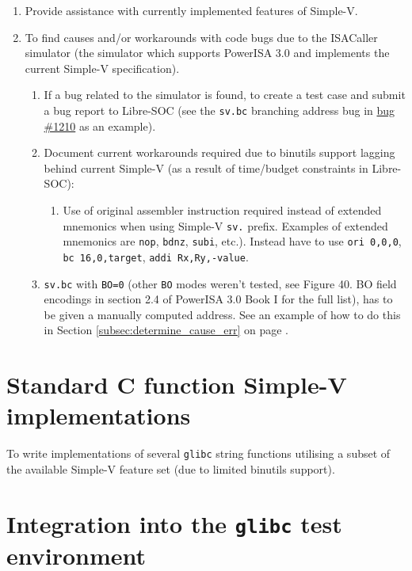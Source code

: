 \begin{enumerate}
  \item Provide assistance with currently implemented features of Simple-V.
  \item To find causes and/or workarounds with code bugs due to the ISACaller
simulator (the simulator which supports PowerISA 3.0 and implements the current
Simple-V specification).
  \begin{enumerate}
    \item If a bug related to the simulator is found, to create a test
  case and submit a bug report to Libre-SOC (see the \texttt{sv.bc} branching address
  bug in \href{https://bugs.libre-soc.org/show_bug.cgi?id=1210}{bug \#1210}
  as an example).
    \item Document current workarounds required due to binutils support lagging
  behind current Simple-V (as a result of time/budget constraints in Libre-SOC):
    \begin{enumerate}
      \item  Use of original assembler instruction required instead of
      extended mnemonics when using Simple-V \texttt{sv.} prefix.
      Examples of extended mnemonics are \texttt{nop}, \texttt{bdnz},
      \texttt{subi}, etc.). Instead have to use
      \texttt{ori 0,0,0}, \texttt{bc 16,0,target}, \texttt{addi Rx,Ry,-value}.
    \end{enumerate}
    \item \texttt{sv.bc} with \texttt{BO=0} (other \texttt{BO} modes weren't tested, see
  Figure 40. BO field encodings in section 2.4 of PowerISA 3.0 Book I
  for the full list), has to be given a manually computed address.
  See an example of how to do this in Section \ref{subsec:determine_cause_err}
  on page \pageref{subsec:determine_cause_err}.
  \end{enumerate}
\end{enumerate}

\section{Standard C function Simple-V implementations}

To write implementations of several \texttt{glibc} string functions utilising a subset
of the available Simple-V feature set (due to limited binutils support).

\section{Integration into the \texttt{glibc} test environment}

